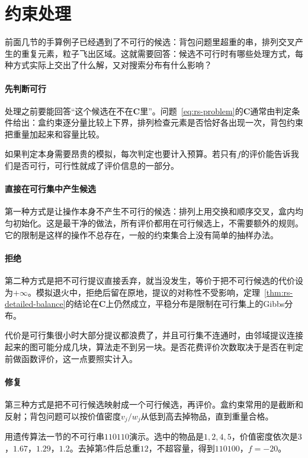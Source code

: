 \section{约束处理}
\label{sec:rs-constraints}

前面几节的手算例子已经遇到了不可行的候选：背包问题里超重的串，排列交叉产生的重复元素，粒子飞出区域。这就需要回答：候选不可行时有哪些处理方式，每种方式实际上交出了什么解，又对搜索分布有什么影响？

\paragraph{先判断可行}
处理之前要能回答“这个候选在不在$\bm{C}$里”。问题~\eqref{eq:rs-problem}的$\bm{C}$通常由判定条件给出：盒约束逐分量比较上下界，排列检查元素是否恰好各出现一次，背包约束把重量加起来和容量比较。

如果判定本身需要昂贵的模拟，每次判定也要计入预算。若只有$f$的评价能告诉我们是否可行，可行性就成了评价信息的一部分。

\paragraph{直接在可行集中产生候选}
第一种方式是让操作本身不产生不可行的候选：排列上用交换和顺序交叉，盒内均匀初始化。这是最干净的做法，所有评价都用在可行候选上，不需要额外的规则。它的限制是这样的操作不总存在，一般的约束集合上没有简单的抽样办法。

\paragraph{拒绝}
第二种方式是把不可行提议直接丢弃，就当没发生，等价于把不可行候选的代价设为$+\infty$。模拟退火中，拒绝后留在原地，提议的对称性不受影响，定理~\ref{thm:rs-detailed-balance}的结论在$\bm{C}$上仍然成立，平稳分布是限制在可行集上的Gibbs分布。

代价是可行集很小时大部分提议都浪费了，并且可行集不连通时，由邻域提议连接起来的图可能分成几块，算法走不到另一块。是否花费评价次数取决于是否在判定前做函数评价，这一点要照实计入。

\paragraph{修复}
第三种方式是把不可行候选映射成一个可行候选，再评价。盒约束常用的是截断和反射；背包问题可以按价值密度$v_j/w_j$从低到高去掉物品，直到重量合格。

用遗传算法一节的不可行串$110110$演示。选中的物品是$1,2,4,5$，价值密度依次是$3$，$1.67$，$1.29$，$1.2$。去掉第$5$件后总重$12$，不超容量，得到$110100$，$f=-20$。

